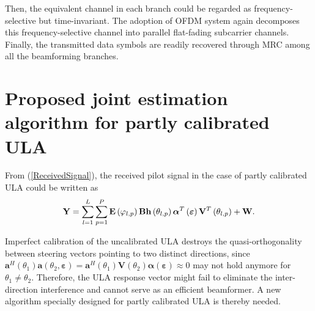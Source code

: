 \documentclass[12pt, draftclsnofoot, onecolumn]{IEEEtran}
\begin{document}
Then, the equivalent channel in each branch could be regarded as frequency-selective but time-invariant. The adoption of OFDM system again decomposes this frequency-selective channel into parallel flat-fading subcarrier channels. Finally, the transmitted data symbols are readily recovered through MRC among all the beamforming branches.



\section{Proposed joint estimation algorithm for partly calibrated ULA}
From (\ref{ReceivedSignal}), the received pilot signal in the case of partly calibrated ULA could be written as
\begin{align}{\label{ReceivedSignalUncalibrated}}
\mathbf{Y}=\sum\limits_{l=1}^{L}{\sum\limits_{p=1}^{P}{\mathbf{E}\left( {{\varphi }_{l,p}} \right)\mathbf{Bh}\left( {{\theta }_{l,p}} \right) {\boldsymbol{\alpha}}^{T}\left( \boldsymbol{\varepsilon} \right) {\mathbf{V}}^{T}\left( \theta_{l,p} \right) }}+\mathbf{W}.
\end{align}

Imperfect calibration of the uncalibrated ULA destroys the quasi-orthogonality between steering vectors pointing to two distinct directions, since ${{\mathbf{a}}^{H}}\left( {{\theta }_{1}} \right)\mathbf{a}\left( {{\theta }_{2}}, \boldsymbol{\varepsilon}  \right)={{\mathbf{a}}^{H}}\left( {{\theta }_{1}} \right) {\mathbf{V}}\left( \theta_{2} \right) {\boldsymbol{\alpha}}\left( \boldsymbol{\varepsilon} \right) \approx 0$ may not hold anymore for ${{\theta }_{1}}\ne {{\theta }_{2}}$. Therefore, the ULA response vector might fail to eliminate the inter-direction interference and cannot serve as an efficient beamformer. A new algorithm specially designed for partly calibrated ULA is thereby needed.


\vspace{-0.6em}
\end{document}
